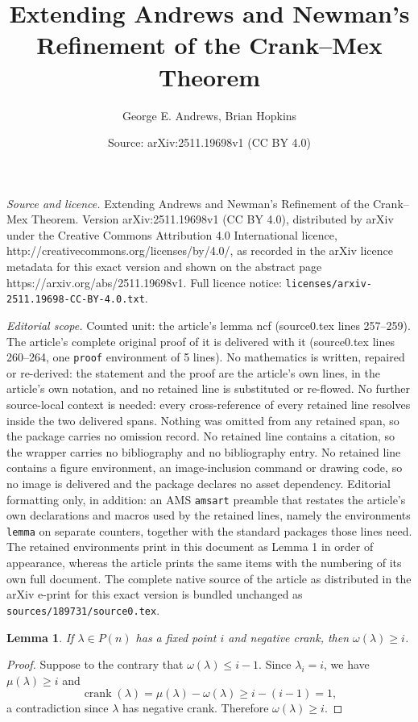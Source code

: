 \documentclass[10pt,a4paper]{amsart}
\title{Extending Andrews and Newman's Refinement of the Crank--Mex Theorem}
\author{George E. Andrews, Brian Hopkins}
\date{Source: arXiv:2511.19698v1 (CC BY 4.0)}
\newtheorem{lemma}{Lemma}
\DeclareMathOperator{\ck}{crank}
\begin{document}
\maketitle

\noindent\emph{Source and licence.} Extending Andrews and Newman's Refinement of the Crank--Mex Theorem. Version arXiv:2511.19698v1 (CC BY 4.0), distributed by arXiv under the Creative Commons Attribution 4.0 International licence, http://creativecommons.org/licenses/by/4.0/, as recorded in the arXiv licence metadata for this exact version and shown on the abstract page https://arxiv.org/abs/2511.19698v1. Full licence notice: \texttt{licenses/arxiv-2511.19698-CC-BY-4.0.txt}.\par\smallskip

\noindent\textit{Editorial scope.} Counted unit: the article's lemma ncf (source0.tex lines 257--259). The article's complete original proof of it is delivered with it (source0.tex lines 260--264, one \texttt{proof} environment of 5 lines). No mathematics is written, repaired or re-derived: the statement and the proof are the article's own lines, in the article's own notation, and no retained line is substituted or re-flowed.  No further source-local context is needed: every cross-reference of every retained line resolves inside the two delivered spans.  Nothing was omitted from any retained span, so the package carries no omission record.  No retained line contains a citation, so the wrapper carries no bibliography and no bibliography entry.  No retained line contains a figure environment, an image-inclusion command or drawing code, so no image is delivered and the package declares no asset dependency.  Editorial formatting only, in addition: an AMS \texttt{amsart} preamble that restates the article's own declarations and macros used by the retained lines, namely the environments \texttt{lemma} on separate counters, together with the standard packages those lines need.  The retained environments print in this document as Lemma 1 in order of appearance, whereas the article prints the same items with the numbering of its own full document.  The complete native source of the article as distributed in the arXiv e-print for this exact version is bundled unchanged as \texttt{sources/189731/source0.tex}.
\begin{lemma} \label{ncf}
If $\lambda \in P(n)$ has a fixed point $i$ and negative crank, then $\omega(\lambda) \ge i$.
\end{lemma}

\begin{proof}
Suppose to the contrary that $\omega(\lambda) \le i-1$.  Since $\lambda_i = i$, we have $\mu(\lambda) \ge i$ and 
\[\ck(\lambda) = \mu(\lambda) - \omega(\lambda) \ge i - (i-1) = 1,\]
a contradiction since $\lambda$ has negative crank.  Therefore $\omega(\lambda) \ge i$.
\end{proof}
\end{document}
